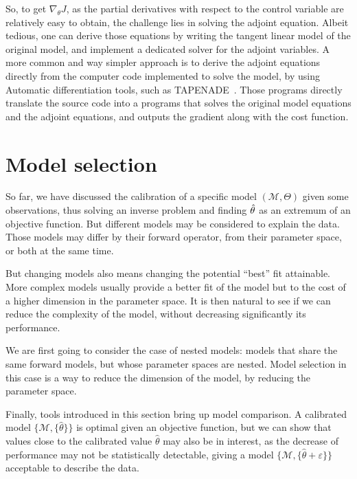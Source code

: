 \documentclass[../../Main_ManuscritThese.tex]{subfiles}
\begin{document}
So, to get $\nabla_\theta J$, as the partial derivatives with respect to the control variable are relatively easy to obtain, the challenge lies in solving the adjoint equation. Albeit tedious, one can derive those equations by writing the tangent linear model of the original model, and implement a dedicated solver for the adjoint variables. A more common and way simpler approach is to derive the adjoint equations directly from the computer code implemented to solve the model, by using Automatic differentiation tools, such as \textsc{TAPENADE}~\cite{hascoet_tapenade_2013}. Those programs directly translate the source code into a programs that solves the original model equations and the adjoint equations, and outputs the gradient along with the cost function.


\section{Model selection}
\label{sec:model_selection}
So far, we have discussed the calibration of a specific model $(\mathcal{M}, \Theta)$ given some observations, thus solving an inverse problem and finding $\hat{\theta}_{\mathrm{}}$ as an extremum of an objective function. But different models may be considered to explain the data. Those models may differ by their forward operator, from their parameter space, or both at the same time.

But changing models also means changing the potential ``best'' fit attainable. More complex models usually provide a better fit of the model but to the cost of a higher dimension in the parameter space.
It is then natural to see if we can reduce the complexity of the model, without decreasing significantly its performance.

We are first going to consider the case of nested models: models that share the same forward models, but whose parameter spaces are nested. Model selection in this case is a way to reduce the dimension of the model, by reducing the parameter space.

Finally, tools introduced in this section bring up model comparison. A calibrated model $\{\mathcal{M},\{\hat{\theta}\}\}$ is optimal given an objective function, but we can show that values close to the calibrated value $\hat{\theta}$ may also be in interest, as the decrease of performance may not be statistically detectable, giving a model $\{\mathcal{M}, \{\hat{\theta} + \varepsilon\}\}$ acceptable to describe the data.
\end{document}
